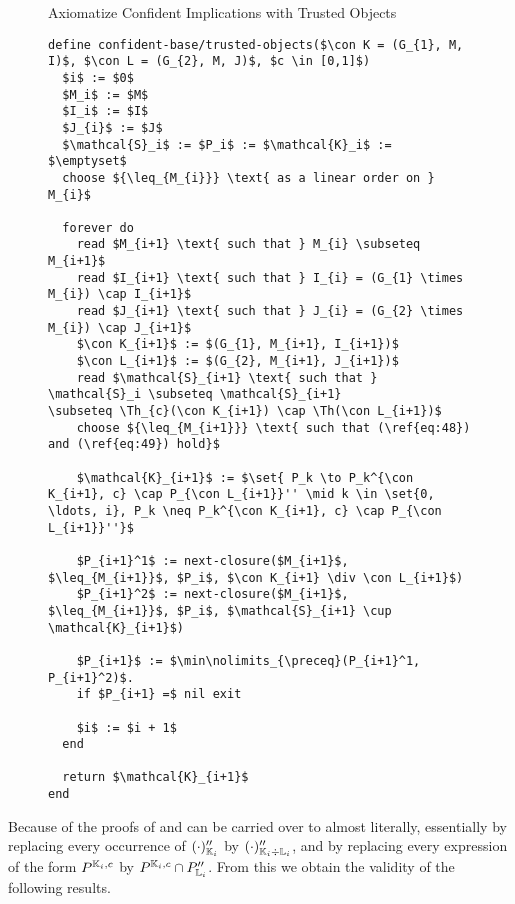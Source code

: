 
\begin{figure}[tp]
  \begin{Algorithm} Axiomatize Confident Implications with Trusted Objects
    \hspace*{0cm}
    \label{alg:confident-base/growing-attributes-trusted-objects}
    \begin{lstlisting}
define confident-base/trusted-objects($\con K = (G_{1}, M, I)$, $\con L = (G_{2}, M, J)$, $c \in [0,1]$)
  $i$ := $0$
  $M_i$ := $M$
  $I_i$ := $I$
  $J_{i}$ := $J$
  $\mathcal{S}_i$ := $P_i$ := $\mathcal{K}_i$ := $\emptyset$
  choose ${\leq_{M_{i}}} \text{ as a linear order on } M_{i}$
  
  forever do
    read $M_{i+1} \text{ such that } M_{i} \subseteq M_{i+1}$
    read $I_{i+1} \text{ such that } I_{i} = (G_{1} \times M_{i}) \cap I_{i+1}$
    read $J_{i+1} \text{ such that } J_{i} = (G_{2} \times M_{i}) \cap J_{i+1}$
    $\con K_{i+1}$ := $(G_{1}, M_{i+1}, I_{i+1})$
    $\con L_{i+1}$ := $(G_{2}, M_{i+1}, J_{i+1})$
    read $\mathcal{S}_{i+1} \text{ such that } \mathcal{S}_i \subseteq \mathcal{S}_{i+1}
\subseteq \Th_{c}(\con K_{i+1}) \cap \Th(\con L_{i+1})$
    choose ${\leq_{M_{i+1}}} \text{ such that (\ref{eq:48}) and (\ref{eq:49}) hold}$

    $\mathcal{K}_{i+1}$ := $\set{ P_k \to P_k^{\con K_{i+1}, c} \cap P_{\con L_{i+1}}'' \mid k \in \set{0, \ldots, i}, P_k \neq P_k^{\con K_{i+1}, c} \cap P_{\con L_{i+1}}''}$

    $P_{i+1}^1$ := next-closure($M_{i+1}$, $\leq_{M_{i+1}}$, $P_i$, $\con K_{i+1} \div \con L_{i+1}$)
    $P_{i+1}^2$ := next-closure($M_{i+1}$, $\leq_{M_{i+1}}$, $P_i$, $\mathcal{S}_{i+1} \cup \mathcal{K}_{i+1}$)

    $P_{i+1}$ := $\min\nolimits_{\preceq}(P_{i+1}^1, P_{i+1}^2)$.
    if $P_{i+1} =$ nil exit

    $i$ := $i + 1$
  end

  return $\mathcal{K}_{i+1}$  
end
    \end{lstlisting}
  \end{Algorithm}
\end{figure}

Because of  the proofs of
 and
 can be carried over to
 almost literally, essentially
by replacing every occurrence of $(\cdot)_{{\mathbb{K}}_{i}}''$ by $(\cdot)_{{\mathbb{K}}_{i} \div
  {\ensuremath{\mathbb{L}}}_{i}}''$, and by replacing every expression of the form $P^{{\mathbb{K}}_{i}, c}$ by
$P^{{\mathbb{K}}_{i}, c} \cap P_{{\mathbb{L}}_{i}}''$.  From this we obtain the validity of the
following results.

